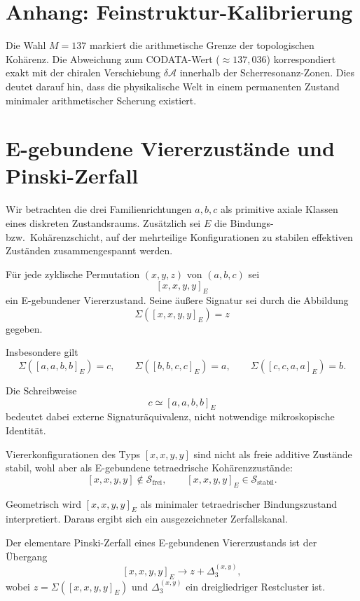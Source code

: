 \documentclass[11pt,a4paper]{article}
\begin{document}
	\section{Anhang: Feinstruktur-Kalibrierung}
	Die Wahl $M=137$ markiert die arithmetische Grenze der topologischen Kohärenz. Die Abweichung zum CODATA-Wert ($\approx 137,036$) korrespondiert exakt mit der chiralen Verschiebung $\delta \mathcal{A}$ innerhalb der Scherresonanz-Zonen. Dies deutet darauf hin, dass die physikalische Welt in einem permanenten Zustand minimaler arithmetischer Scherung existiert.
	
	\section{E-gebundene Viererzustände und Pinski-Zerfall}
	
	Wir betrachten die drei Familienrichtungen \(a,b,c\) als primitive axiale Klassen eines diskreten Zustandsraums. Zusätzlich sei \(E\) die Bindungs- bzw.\ Kohärenzschicht, auf der mehrteilige Konfigurationen zu stabilen effektiven Zuständen zusammengespannt werden.
	
	\begin{definition}
		Für jede zyklische Permutation \((x,y,z)\) von \((a,b,c)\) sei
		\[
		[x,x,y,y]_E
		\]
		ein E-gebundener Viererzustand. Seine äußere Signatur sei durch die Abbildung
		\[
		\Sigma([x,x,y,y]_E)=z
		\]
		gegeben.
	\end{definition}
	
	Insbesondere gilt
	\[
	\Sigma([a,a,b,b]_E)=c,\qquad
	\Sigma([b,b,c,c]_E)=a,\qquad
	\Sigma([c,c,a,a]_E)=b.
	\]
	
	Die Schreibweise
	\[
	c \simeq [a,a,b,b]_E
	\]
	bedeutet dabei externe Signaturäquivalenz, nicht notwendige mikroskopische Identität.
	
	\begin{axiom}
		Viererkonfigurationen des Typs \([x,x,y,y]\) sind nicht als freie additive Zustände stabil, wohl aber als E-gebundene tetraedrische Kohärenzzustände:
		\[
		[x,x,y,y]\notin \mathcal S_{\mathrm{frei}},
		\qquad
		[x,x,y,y]_E \in \mathcal S_{\mathrm{stabil}}.
		\]
	\end{axiom}
	
	Geometrisch wird \([x,x,y,y]_E\) als minimaler tetraedrischer Bindungszustand interpretiert. Daraus ergibt sich ein ausgezeichneter Zerfallskanal.
	
	\begin{definition}
		Der elementare Pinski-Zerfall eines E-gebundenen Viererzustands ist der Übergang
		\[
		[x,x,y,y]_E \longrightarrow z + \Delta_3^{(x,y)},
		\]
		wobei \(z=\Sigma([x,x,y,y]_E)\) und \(\Delta_3^{(x,y)}\) ein dreigliedriger Restcluster ist.
	\end{definition}
	
\end{document}
